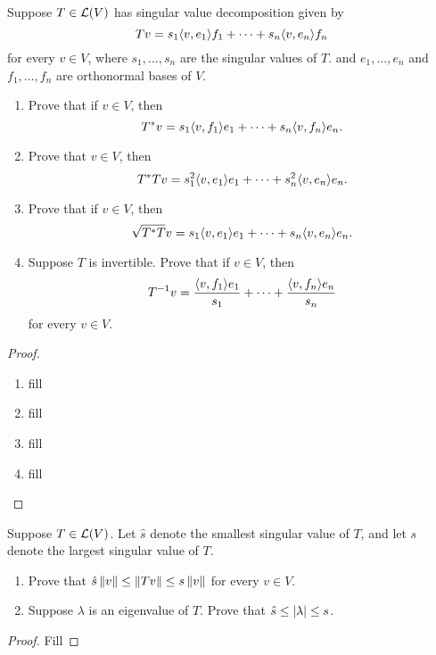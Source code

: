 \begin{exercise}{17}
  Suppose $T\in\mathcal{L}(V)$ has singular value decomposition given by 
  \[
  Tv =s_1\langle v,e_1\rangle f_1+\dots+s_n\langle v,e_n\rangle f_n
  \]
  for every $v\in V$, where $s_1,\dots,s_n$ are the singular values of $T$. and $e_1,\dots,e_n$ and $f_1,\dots,f_n$ are orthonormal bases of $V$.
  \begin{enumerate}
      \item Prove that if $v\in V$, then
      \[
      T^\ast v =s_1\langle v,f_1\rangle e_1+\dots+s_n\langle v,f_n\rangle e_n.
      \]
      \item Prove that $v\in V$, then
      \[
      T^\ast Tv =s_1^2\langle v,e_1\rangle e_1+\dots+s_n^2\langle v,e_n\rangle e_n.
      \]
      \item Prove that if $v\in V$, then
      \[
      \sqrt{T^\ast T}v =s_1\langle v,e_1\rangle e_1+\dots+s_n\langle v,e_n\rangle e_n.
      \]
      \item Suppose $T$ is invertible. Prove that if $v\in V$, then 
      \[
      T^{-1}v =\frac{\langle v,f_1\rangle e_1}{s_1}+\dots+\frac{\langle v,f_n\rangle e_n}{s_n}
      \]
      for every $v\in V$.
  \end{enumerate}
\end{exercise}
\begin{proof}
 \begin{enumerate}
     \item fill
     \item fill
     \item fill
     \item fill
 \end{enumerate}
\end{proof}

\begin{exercise}{18}
  Suppose $T\in\mathcal{L}(V)$. Let $\hat{s}$ denote the smallest singular value of $T$, and let $s$ denote the largest singular value of $T$.
  \begin{enumerate}
      \item Prove that $\hat{s}\left\lVert v\right\rVert \leq\left\lVert Tv\right\rVert \leq s\left\lVert v\right\rVert$ for every $v\in V$.
      \item Suppose $\lambda$ is an eigenvalue of $T$. Prove that $\hat{s} \leq\left\lvert \lambda\right\rvert \leq s$.
  \end{enumerate}
\end{exercise}
\begin{proof}
 Fill
\end{proof}